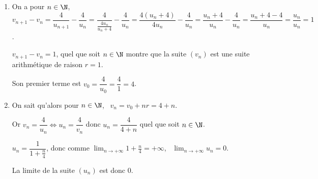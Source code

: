 \begin{enumerate}
\item 






On a pour $n \in \N$, \\$v_{n+1} - v_n = \dfrac{4}{u_{n+1}} - \dfrac{4}{u_n} = \dfrac{4}{\frac{4u_n}{u_n + 4}} - \dfrac{4}{u_n} = \dfrac{4\left(u_n + 4 \right)}{4u_n} - \dfrac{4}{u_n} = \dfrac{u_n + 4}{u_n} - \dfrac{4}{u_n} = \dfrac{u_n + 4 - 4}{u_n} = \dfrac{u_n}{u_n} = 1$.

$v_{n+1} - v_n = 1$, quel que soit $n \in \N$ montre que la suite $\left(v_n\right)$ est une suite arithmétique de raison $r = 1$.

Son premier terme est $v_0 = \dfrac{4}{u_0} = \dfrac{4}{1} = 4$.

\item 
On sait qu'alors pour $n \in \N$, \, $v_n = v_0 + nr = 4 + n$.

Or $v_n = \dfrac{4}{u_n} \iff u_n = \dfrac{4}{v_n}$ donc $u_n = \dfrac{4}{4 + n}$ quel que soit $n \in \N$.

$u_n = \dfrac{1}{1 + \frac{n}{4}}$, donc comme $\displaystyle\lim_{n \to + \infty} 1 + \frac{n}{4} = + \infty$, \, $\displaystyle\lim_{n \to + \infty} u_n = 0$.


La limite de la suite $\left(u_n\right)$ est donc $0$.
\end{enumerate}

\bigskip

